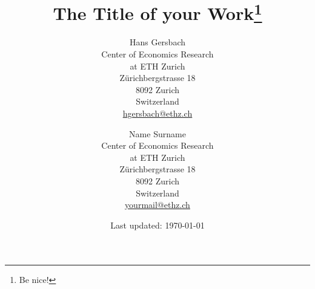 \documentclass[
	12pt, %
	a4paper, %
	]{article}
\theoremstyle{break} %
\begin{document}
\begin{titlepage}
\singlespacing
\title{
	The Title of your Work\thanks{Be nice!}
}

\author{
	Hans Gersbach\\
	\normalsize Center of Economics Research\\
	\normalsize at ETH Zurich\\ 
	\normalsize Z\"{u}richbergstrasse 18\\
	\normalsize 8092 Zurich\\
	\normalsize Switzerland\\ 
	\normalsize \href{mailto:hgersbach@ethz.ch}{hgersbach@ethz.ch}
	\and
	Name Surname\\
	\normalsize Center of Economics Research\\
	\normalsize at ETH Zurich\\ 
	\normalsize Z\"{u}richbergstrasse 18\\
	\normalsize 8092 Zurich\\
	\normalsize Switzerland\\ 
	\normalsize \href{mailto:yourmail@ethz.ch}{yourmail@ethz.ch}
	}

\date{Last updated: \today}

\maketitle


\end{titlepage}
\end{document}
